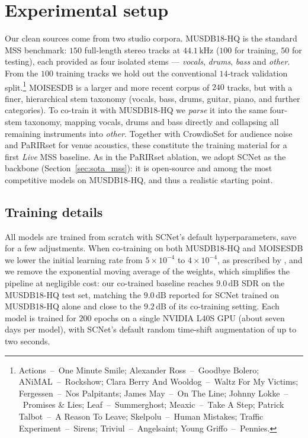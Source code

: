 \section{Experimental setup}
\label{sec:mss_setup}

Our clean sources come from two studio corpora. MUSDB18-HQ
\citep{rafii2019musdbhq} is the standard \acrshort{MSS} benchmark: $150$
full-length stereo tracks at $44.1\,\text{kHz}$ ($100$ for training, $50$ for
testing), each provided as four isolated stems --- \emph{vocals}, \emph{drums},
\emph{bass} and \emph{other}. From the $100$ training tracks we hold out the
conventional $14$-track validation split.\footnote{Actions~--~One Minute Smile;
Alexander Ross~--~Goodbye Bolero; ANiMAL~--~Rockshow; Clara Berry And
Wooldog~--~Waltz For My Victims; Fergessen~--~Nos Palpitants; James May~--~On
The Line; Johnny Lokke~--~Promises \& Lies; Leaf~--~Summerghost; Meaxic~--~Take
A Step; Patrick Talbot~--~A Reason To Leave; Skelpolu~--~Human Mistakes; Traffic
Experiment~--~Sirens; Triviul~--~Angelsaint; Young Griffo~--~Pennies.}
MOISESDB \citep{pereira2023moisesdb} is a larger and more recent corpus of
$240$ tracks, but with a finer, hierarchical stem taxonomy (vocals, bass, drums,
guitar, piano, and further categories). To co-train it with MUSDB18-HQ we
\emph{parse} it into the same four-stem taxonomy, mapping vocals, drums and bass
directly and collapsing all remaining instruments into \emph{other}. Together
with CrowdioSet for audience noise and PaRIRset for venue acoustics, these
constitute the training material for a first \emph{Live} \acrshort{MSS}
baseline. As in the PaRIRset ablation, we adopt SCNet \citep{tong2024scnet} as
the backbone (Section~\ref{sec:sota_mss}): it is open-source and among the most
competitive models on MUSDB18-HQ, and thus a realistic starting point.

\subsection{Training details}
\label{ssec:mss_training}

All models are trained from scratch with SCNet's default hyperparameters, save
for a few adjustments. When co-training on both MUSDB18-HQ and MOISESDB we lower the
initial learning rate from $5\times10^{-4}$ to $4\times10^{-4}$, as prescribed
by \citet{tong2024scnet}, and we remove the exponential moving average of the
weights, which simplifies the pipeline at negligible cost: our co-trained
baseline reaches $9.0\,\text{dB}$ \acrshort{SDR} on the MUSDB18-HQ test set,
matching the $9.0\,\text{dB}$ reported for SCNet trained on MUSDB18-HQ alone and
close to the $9.2\,\text{dB}$ of its co-training setting. Each model is trained
for $200$ epochs on a single NVIDIA L40S \acrshort{GPU} (about seven days per
model), with SCNet's default random time-shift augmentation of up to two
seconds.

